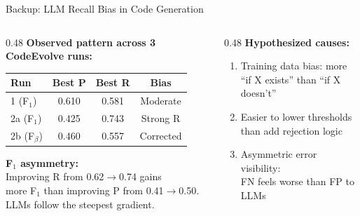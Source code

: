 \documentclass[aspectratio=169,12pt]{beamer}
\begin{document}
\begin{frame}{Backup: LLM Recall Bias in Code Generation}
  \begin{columns}[T]
    \begin{column}{0.48\textwidth}
      \textbf{Observed pattern across 3 CodeEvolve runs:}

      \vspace{0.3em}
      {\small
      \begin{table}
        \begin{tabular}{@{}lccc@{}}
          \toprule
          Run & Best P & Best R & Bias \\
          \midrule
          1 (F$_1$) & 0.610 & 0.581 & Moderate \\
          2a (F$_1$) & 0.425 & 0.743 & \alert{Strong R} \\
          2b (F$_\beta$) & 0.460 & 0.557 & Corrected \\
          \bottomrule
        \end{tabular}
      \end{table}
      }

      \vspace{0.3em}
      \textbf{F$_1$ asymmetry:}\\
      {\small Improving R from 0.62$\to$0.74 gains\\
       more F$_1$ than improving P from 0.41$\to$0.50.\\
       LLMs follow the steepest gradient.}
    \end{column}
    \begin{column}{0.48\textwidth}
      \textbf{Hypothesized causes:}
      \begin{enumerate}
        \item Training data bias: more\\
              ``if X exists'' than ``if X doesn't''
        \item Easier to lower thresholds\\
              than add rejection logic
        \item Asymmetric error visibility:\\
              FN feels worse than FP to LLMs
      \end{enumerate}


\end{column}
\end{columns}
\end{frame}
\end{document}
